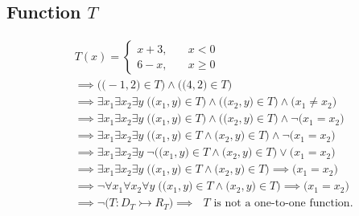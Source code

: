 \documentclass[12pt, letterpaper]{article}
\begin{document}
        \subsection{Function \(T\) }
        \vspace{-18pt}
        \begin{align*}
            &T(x) = \begin{cases} x+3, \quad &x<0 \\ 6-x, \quad &x \geq 0 \end{cases} \\
            & \implies \Big(\big(-1, 2\big) \in T\Big) \wedge \Big(\big(4, 2\big) \in T\Big) \\ 
            & \implies \exists x_1 \exists x_2 \exists y \; \Big( \big(x_1, y\big) \in T \Big) \wedge
                                                   \Big( \big(x_2, y\big) \in T \Big) \wedge
                                                   \Big( x_1 \neq x_2 \Big) \\
            & \implies \exists x_1 \exists x_2 \exists y \; \Big( \big(x_1, y\big) \in T \Big) \wedge
                                                   \Big( \big(x_2, y\big) \in T \Big) \wedge
                                                   \neg\Big( x_1 = x_2 \Big) \\
            & \implies \exists x_1 \exists x_2 \exists y \; \Big( \big(x_1, y\big) \in T \wedge
                                                   \big(x_2, y\big) \in T \Big) \wedge
                                                   \neg\Big( x_1 = x_2 \Big) \\
            & \implies \exists x_1 \exists x_2 \exists y \; \neg\Big( \big(x_1, y\big) \in T \wedge
                                                   \big(x_2, y\big) \in T \Big) \lor
                                                   \Big( x_1 = x_2 \Big) \\
            & \implies \exists x_1 \exists x_2 \exists y \; \Big( \big(x_1, y\big) \in T \wedge
                                                   \big(x_2, y\big) \in T \Big) \implies
                                                   \Big( x_1 = x_2 \Big) \\
            & \implies \neg\forall x_1 \forall x_2 \forall y \; \Big( \big(x_1, y\big) \in T \wedge
                                                   \big(x_2, y\big) \in T \Big) \implies
                                                   \Big( x_1 = x_2 \Big) \\
            & \implies \neg\Big( T : D_{T} \rightarrowtail R_{T} \Big)
              \implies \text{ \(T\) is not a one-to-one function.}
        \end{align*}
\end{document}
